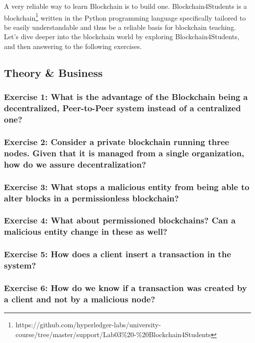 \documentclass[12pt,a4paper]{article}
\theoremstyle{definition}
\begin{document}
A very reliable way to learn Blockchain is to build one. Blockchain4Students is a blockchain\footnote{https://github.com/hyperledger-labs/university-course/tree/master/support/Lab03\%20-\%20Blockchain4Students} written in the Python programming language specifically tailored to be easily understandable and thus be a reliable basis for blockchain teaching. Let's dive deeper into the blockchain world by exploring Blockchain4Students, and then answering to the following exercises.


\subsection{Theory \& Business}


\subsubsection*{Exercise 1: What is the advantage of the Blockchain being a decentralized, Peer-to-Peer system instead of a centralized one?}

\subsubsection*{Exercise 2: Consider a private blockchain running three nodes. Given that it is managed from a single organization, how do we assure decentralization?}

\subsubsection*{Exercise 3: What stops a malicious entity from being able to alter blocks in a permissionless blockchain?}

\subsubsection*{Exercise 4: What about permissioned blockchains? Can a malicious entity change in these as well?}

\subsubsection*{Exercise 5: How does a client insert a transaction in the system?
}

\subsubsection*{Exercise 6: How do we know if a transaction was created by a client and not by a malicious node?}
\end{document}
